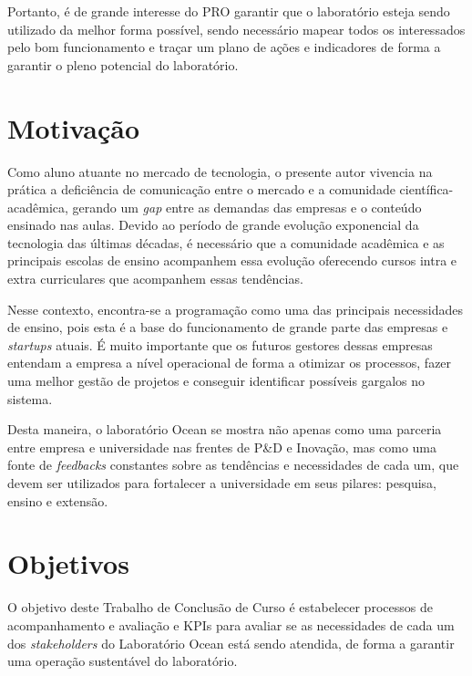 Portanto, é de grande interesse do PRO garantir que o laboratório esteja sendo utilizado da melhor forma possível, sendo necessário mapear todos os interessados pelo bom funcionamento e traçar um plano de ações e indicadores de forma a garantir o pleno potencial do laboratório.

\section{Motivação} %
\label{cha:motivacao}

Como aluno atuante no mercado de tecnologia, o presente autor vivencia na prática a deficiência de comunicação entre o mercado e a comunidade científica-acadêmica, gerando um \textit{gap} entre as demandas das empresas e o conteúdo ensinado nas aulas. Devido ao período de grande evolução exponencial da tecnologia das últimas décadas, é necessário que a comunidade acadêmica e as principais escolas de ensino acompanhem essa evolução oferecendo cursos intra e extra curriculares que acompanhem essas tendências.

Nesse contexto, encontra-se a programação como uma das principais necessidades de ensino, pois esta é a base do funcionamento de grande parte das empresas e \textit{startups} atuais. É muito importante que os futuros gestores dessas empresas entendam a empresa a nível operacional de forma a otimizar os processos, fazer uma melhor gestão de projetos e conseguir identificar possíveis gargalos no sistema.

Desta maneira, o laboratório Ocean se mostra não apenas como uma parceria entre empresa e universidade nas frentes de  P\&D e Inovação, mas como uma fonte de \textit{feedbacks} constantes sobre as tendências e necessidades de cada um, que devem ser utilizados para fortalecer a universidade em seus pilares: pesquisa, ensino e extensão.

\section[Objetivos]{Objetivos}
\label{chap:objetivos}

O objetivo deste Trabalho de Conclusão de Curso é estabelecer processos de acompanhamento e avaliação e KPIs para avaliar se as necessidades de cada um dos \textit{stakeholders} do Laboratório Ocean está sendo atendida, de forma a garantir uma operação sustentável do laboratório.